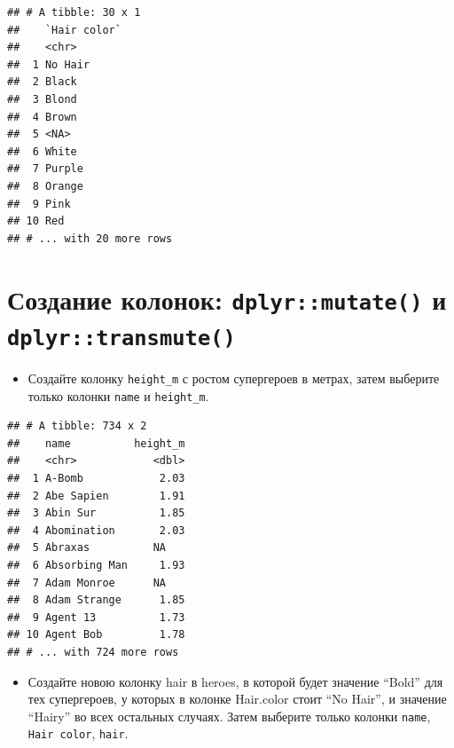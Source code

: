 \documentclass[]{book}
\newenvironment{Shaded}{\begin{snugshade}}{\end{snugshade}}
\newcommand{\KeywordTok}[1]{\textcolor[rgb]{0.13,0.29,0.53}{\textbf{#1}}}
\newcommand{\DataTypeTok}[1]{\textcolor[rgb]{0.13,0.29,0.53}{#1}}
\newcommand{\DecValTok}[1]{\textcolor[rgb]{0.00,0.00,0.81}{#1}}
\newcommand{\StringTok}[1]{\textcolor[rgb]{0.31,0.60,0.02}{#1}}
\newcommand{\OperatorTok}[1]{\textcolor[rgb]{0.81,0.36,0.00}{\textbf{#1}}}
\newcommand{\NormalTok}[1]{#1}
\providecommand{\tightlist}{%
  \setlength{\itemsep}{0pt}\setlength{\parskip}{0pt}}
\begin{document}
\begin{verbatim}
## # A tibble: 30 x 1
##    `Hair color`
##    <chr>       
##  1 No Hair     
##  2 Black       
##  3 Blond       
##  4 Brown       
##  5 <NA>        
##  6 White       
##  7 Purple      
##  8 Orange      
##  9 Pink        
## 10 Red         
## # ... with 20 more rows
\end{verbatim}

\section{\texorpdfstring{Создание колонок: \texttt{dplyr::mutate()} и
\texttt{dplyr::transmute()}}{Создание колонок: dplyr::mutate() и dplyr::transmute()}}\label{solution_mutate}

\begin{itemize}
\tightlist
\item
  Создайте колонку \texttt{height\_m} с ростом супергероев в метрах,
  затем выберите только колонки \texttt{name} и \texttt{height\_m}.
\end{itemize}

\begin{Shaded}
\end{Shaded}

\begin{verbatim}
## # A tibble: 734 x 2
##    name          height_m
##    <chr>            <dbl>
##  1 A-Bomb            2.03
##  2 Abe Sapien        1.91
##  3 Abin Sur          1.85
##  4 Abomination       2.03
##  5 Abraxas          NA   
##  6 Absorbing Man     1.93
##  7 Adam Monroe      NA   
##  8 Adam Strange      1.85
##  9 Agent 13          1.73
## 10 Agent Bob         1.78
## # ... with 724 more rows
\end{verbatim}

\begin{itemize}
\tightlist
\item
  Создайте новою колонку hair в heroes, в которой будет значение
  ``Bold'' для тех супергероев, у которых в колонке Hair.color стоит
  ``No Hair'', и значение ``Hairy'' во всех остальных случаях. Затем
  выберите только колонки \texttt{name}, \texttt{Hair\ color},
  \texttt{hair}.
\end{itemize}
\end{document}
